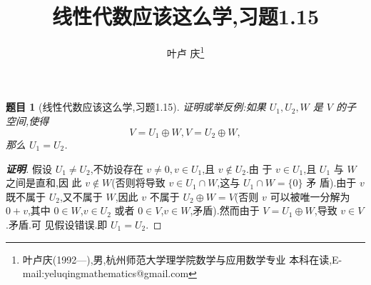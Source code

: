 \documentclass[a4paper]{article}
\newtheorem*{exe}{题目}
\newenvironment{exercise}
{\bigskip\begin{mdframed}\begin{exe}}
    {\end{exe}\end{mdframed}\bigskip}
\begin{document}
\title{\huge{\bf{线性代数应该这么学,习题1.15}}} \author{\small{叶卢
    庆\footnote{叶卢庆(1992---),男,杭州师范大学理学院数学与应用数学专业
      本科在读,E-mail:yeluqingmathematics@gmail.com}}}
\maketitle
\begin{exercise}[线性代数应该这么学,习题1.15]
证明或举反例:如果 $U_1,U_2,W$ 是 $V$ 的子空间,使得
$$
V=U_1\oplus W,V=U_2\oplus W,
$$
那么 $U_1=U_2$. 
\end{exercise}
\begin{proof}[\textbf{证明}]
假设 $U_1\neq U_2$,不妨设存在 $v\neq 0,v\in U_1$,且 $v\not\in U_2$.由
于 $v\in U_1$,且 $U_1$ 与 $W$ 之间是直和,因
此 $v\not\in W$(否则将导致 $v\in U_1\cap W$,这与 $U_1\cap W=\{0\}$ 矛
盾).由于 $v$ 既不属于 $U_2$,又不属于 $W$,因此 $v$ 不属于 $U_2\oplus
W=V$(否则 $v$ 可以被唯一分解为 $0+v$,其中 $0\in W$,$v\in U_2$ 或者
$0\in V$,$v\in W$,矛盾).然而由于 $V=U_1\oplus W$,导致 $v\in V$.矛盾.可
见假设错误.即 $U_1=U_2$.
\end{proof}
\end{document}
